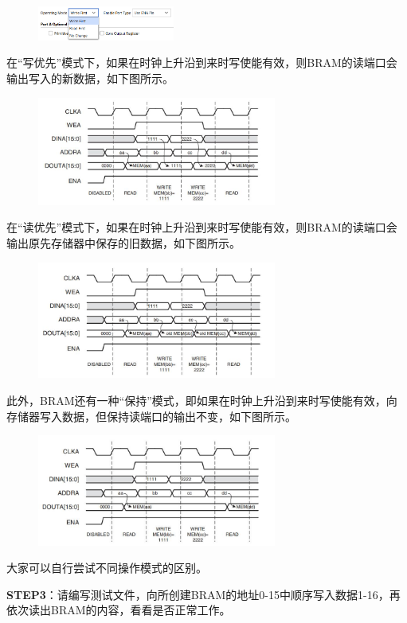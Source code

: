 \documentclass{ctexart}
\begin{document}
\begin{figure}[H]
    \centering
    \includegraphics[width=0.4\textwidth]{lab3/16.png}
\end{figure}

在“写优先”模式下，如果在时钟上升沿到来时写使能有效，则BRAM的读端口会输出写入的新数据，如下图所示。

\begin{figure}[H]
    \centering
    \includegraphics[width=0.7\textwidth]{lab3/13.jpg}
\end{figure}

在“读优先”模式下，如果在时钟上升沿到来时写使能有效，则BRAM的读端口会输出原先存储器中保存的旧数据，如下图所示。

\begin{figure}[H]
    \centering
    \includegraphics[width=0.7\textwidth]{lab3/14.jpg}
\end{figure}

此外，BRAM还有一种“保持”模式，即如果在时钟上升沿到来时写使能有效，向存储器写入数据，但保持读端口的输出不变，如下图所示。

\begin{figure}[H]
    \centering
    \includegraphics[width=0.7\textwidth]{lab3/15.jpg}
\end{figure}

大家可以自行尝试不同操作模式的区别。

\textbf{STEP3}：请编写测试文件，向所创建BRAM的地址0-15中顺序写入数据1-16，再依次读出BRAM的内容，看看是否正常工作。
\end{document}
